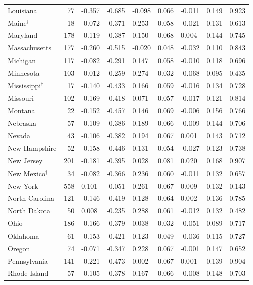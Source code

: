 \begin{table}[htbp]
\begin{tabular}{lrlllllll}
  Louisiana &  77 & -0.357 & -0.685 & -0.098 & 0.066 & -0.011 & 0.149 & 0.923 \\ 
  Maine$^{\dagger}$ &  18 & -0.072 & -0.371 & 0.253 & 0.058 & -0.021 & 0.131 & 0.613 \\ 
  Maryland & 178 & -0.119 & -0.387 & 0.150 & 0.068 & 0.004 & 0.144 & 0.745 \\ 
  Massachusetts & 177 & -0.260 & -0.515 & -0.020 & 0.048 & -0.032 & 0.110 & 0.843 \\ 
  Michigan & 117 & -0.082 & -0.291 & 0.147 & 0.058 & -0.010 & 0.118 & 0.696 \\ 
  Minnesota & 103 & -0.012 & -0.259 & 0.274 & 0.032 & -0.068 & 0.095 & 0.435 \\ 
  Mississippi$^{\dagger}$ &  17 & -0.140 & -0.433 & 0.166 & 0.059 & -0.016 & 0.134 & 0.728 \\ 
  Missouri & 102 & -0.169 & -0.418 & 0.071 & 0.057 & -0.017 & 0.121 & 0.814 \\ 
  Montana$^{\dagger}$ &  22 & -0.152 & -0.457 & 0.146 & 0.069 & -0.006 & 0.156 & 0.766 \\ 
  Nebraska &  57 & -0.109 & -0.386 & 0.189 & 0.066 & -0.009 & 0.144 & 0.706 \\ 
  Nevada &  43 & -0.106 & -0.382 & 0.194 & 0.067 & 0.001 & 0.143 & 0.712 \\ 
  New Hampshire &  52 & -0.158 & -0.446 & 0.131 & 0.054 & -0.027 & 0.123 & 0.738 \\ 
  New Jersey & 201 & -0.181 & -0.395 & 0.028 & 0.081 & 0.020 & 0.168 & 0.907 \\ 
  New Mexico$^{\dagger}$ &  34 & -0.082 & -0.366 & 0.236 & 0.060 & -0.011 & 0.132 & 0.657 \\ 
  New York & 558 & 0.101 & -0.051 & 0.261 & 0.067 & 0.009 & 0.132 & 0.143 \\ 
  North Carolina & 121 & -0.146 & -0.419 & 0.128 & 0.064 & 0.002 & 0.136 & 0.785 \\ 
  North Dakota &  50 & 0.008 & -0.235 & 0.288 & 0.061 & -0.012 & 0.132 & 0.482 \\ 
  Ohio & 186 & -0.166 & -0.379 & 0.038 & 0.032 & -0.051 & 0.089 & 0.717 \\ 
  Oklahoma &  61 & -0.153 & -0.421 & 0.123 & 0.049 & -0.036 & 0.115 & 0.727 \\ 
  Oregon &  74 & -0.071 & -0.347 & 0.228 & 0.067 & -0.001 & 0.147 & 0.652 \\ 
  Pennsylvania & 141 & -0.221 & -0.473 & 0.002 & 0.067 & 0.001 & 0.139 & 0.904 \\ 
  Rhode Island &  57 & -0.105 & -0.378 & 0.167 & 0.066 & -0.008 & 0.148 & 0.703 \\ 

\end{tabular}
\end{table}
